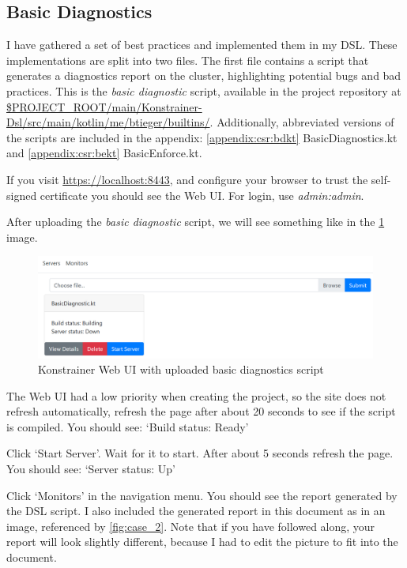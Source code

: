 \subsection{Basic Diagnostics}

I have gathered a set of best practices and implemented them in my DSL. These implementations are split into two files. The first file contains a script that generates a diagnostics report on the cluster, highlighting potential bugs and bad practices. This is the \emph{basic diagnostic} script, available in the project repository at \url{$PROJECT_ROOT/main/Konstrainer-Dsl/src/main/kotlin/me/btieger/builtins/}. Additionally, abbreviated versions of the scripts are included in the appendix: \ref{appendix:csr:bdkt} BasicDiagnostics.kt and \ref{appendix:csr:bekt} BasicEnforce.kt.

If you visit \url{https://localhost:8443}, and configure your browser to trust the self-signed certificate you should see the Web UI. For login, use \emph{admin:admin}. 

After uploading the \emph{basic diagnostic} script, we will see something like in the \ref{fig:case_1} image.

\begin{figure}[h]
  \centering
  \includegraphics[width=130mm, keepaspectratio]{content/30_caseStudy1/main_menu_with_uploaded_building_dagnotics.png}
  \caption{Konstrainer Web UI with uploaded basic diagnostics script}
  \label{fig:case_1}
\end{figure}

The Web UI had a low priority when creating the project, so the site does not refresh automatically, refresh the page after about 20 seconds to see if the script is compiled. You should see: `Build status: Ready'

Click `Start Server'. Wait for it to start. After about 5 seconds refresh the page. You should see: `Server status: Up'

Click `Monitors' in the navigation menu. You should see the report generated by the DSL script. I also included the generated report in this document as in an image, referenced by \ref{fig:case_2}. Note that if you have followed along, your report will look slightly different, because I had to edit the picture to fit into the document.

